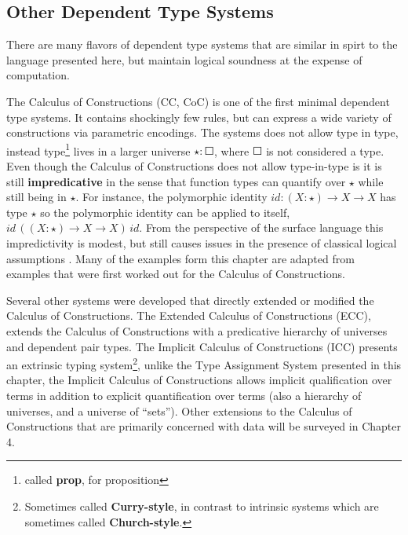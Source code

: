 
\subsection{Other Dependent Type Systems}

There are many flavors of dependent type systems that are similar in spirt to the language presented here, but maintain logical soundness at the expense of computation.


The Calculus of Constructions (CC, CoC)\cite{10.1016/0890-5401(88)90005-3} is one of the first minimal dependent type systems.
It contains shockingly few rules, but can express a wide variety of constructions via parametric encodings.
The systems does not allow type in type, instead type\footnote{called \textbf{prop}, for proposition} lives in a larger universe $\star:\Square$, where $\Square$ is not considered a type.
Even though the Calculus of Constructions does not allow type-in-type is it is still \textbf{impredicative }in the sense that function types can quantify over $\star$ while still being in $\star$.
For instance, the polymorphic identity $id:(X:\star)\rightarrow X\rightarrow X$ has type $\star$ so the polymorphic identity can be applied to itself, $id\,\left((X:\star)\rightarrow X\rightarrow X\right)\,id$.
From the perspective of the surface language this impredictivity is modest, but still causes issues in the presence of classical logical assumptions .
Many of the examples form this chapter are adapted from examples that were first worked out for the Calculus of Constructions.

Several other systems were developed that directly extended or modified the Calculus of Constructions.
The Extended Calculus of Constructions (ECC)\cite{luo1990extended,luo1994computation}, extends the Calculus of Constructions with a predicative hierarchy of universes and dependent pair types.
The Implicit Calculus of Constructions (ICC)\cite{10.1007/3-540-45413-6_27,10.1007/978-3-540-78499-9_26} presents an extrinsic typing system\footnote{Sometimes called \textbf{Curry-style}, in contrast to intrinsic systems which are sometimes called \textbf{Church-style}.}, unlike the Type Assignment System presented in this chapter, the Implicit Calculus of Constructions allows implicit qualification over terms in addition to explicit quantification over terms (also a hierarchy of universes, and a universe of ``sets'').
Other extensions to the Calculus of Constructions that are primarily concerned with data will be surveyed in Chapter 4.

